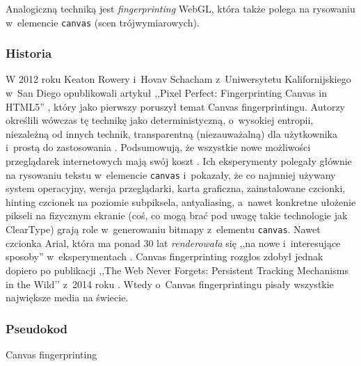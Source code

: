 Analogiczną techniką jest \emph{fingerprinting} WebGL, która także polega na
rysowaniu w~elemencie \texttt{canvas} (scen trójwymiarowych).

\subsubsection{Historia}
W 2012 roku Keaton Rowery i~Hovav Schacham z~Uniwersytetu Kalifornijskiego w~San
Diego opublikowali artykuł ,,Pixel Perfect: Fingerprinting Canvas in HTML5''
\cite{mowery2012pixel}, który jako pierwszy poruszył temat Canvas
fingerprintingu. Autorzy określili wówczas tę technikę jako deterministyczną,
o~wysokiej entropii, niezależną od innych technik, transparentną (niezauważalną)
dla użytkownika i~prostą do zastosowania \cite[s. 1]{mowery2012pixel}.
Podsumowują, że wszystkie nowe możliwości przeglądarek internetowych mają swój
koszt \cite[s. 3]{mowery2012pixel}. Ich eksperymenty polegały głównie na
rysowaniu tekstu w~elemencie \texttt{canvas} i~pokazały, że co najmniej używany
system operacyjny, wersja przeglądarki, karta graficzna, zainstalowane czcionki,
hinting czcionek na poziomie subpiksela, antyaliasing, a~nawet konkretne
ułożenie pikseli na fizycznym ekranie (coś, co mogą brać pod uwagę takie
technologie jak ClearType) grają role w~generowaniu bitmapy z~elementu
\texttt{canvas}. Nawet czcionka Arial, która ma ponad 30 lat \emph{renderowała}
się ,,na nowe i~interesujące sposoby'' w~eksperymentach \cite[s.
6]{mowery2012pixel}. Canvas fingerprinting rozgłos zdobył jednak dopiero po
publikacji ,,The Web Never Forgets: Persistent Tracking Mechanisms in the Wild’’
z~2014 roku \cite{acar2014web}. Wtedy o~Canvas fingerprintingu pisały wszystkie
największe media na świecie.

\subsubsection{Pseudokod}
\begin{algorithm}
	\SetAlgoVlined
	\BlankLine
	\BlankLine
	\;
	\caption{Canvas fingerprinting}
\end{algorithm}


